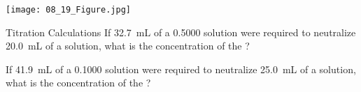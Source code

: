 \documentclass[notes=only]{beamer}
\begin{document}
\begin{frame}
	\texttt{[image: 08\_19\_Figure.jpg]}
\end{frame}

\begin{frame}[t]{Titration Calculations}
	If \SI{32.7}{\milli\liter} of a \SI{0.5000}{\Molar}  solution
	were required to neutralize \SI{20.0}{\milli\liter} of a 
	solution, what is the concentration of the ?

\end{frame}

\begin{onyourown}
	If \SI{41.9}{\milli\liter} of a \SI{0.1000}{\Molar}  solution
	were required to neutralize \SI{25.0}{\milli\liter} of a 
	solution, what is the concentration of the ?
\end{onyourown}

\clearpage
\end{document}

